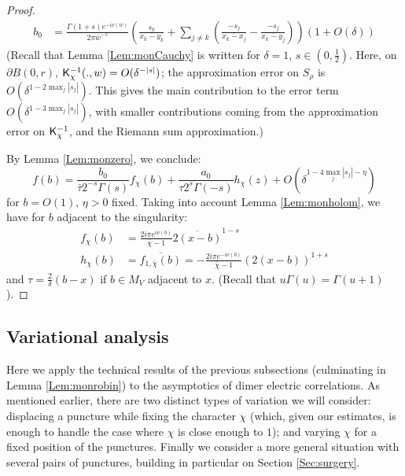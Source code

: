 \documentclass[10pt]{article}
\newcommand{\rK}{{\sf K}}
\begin{document}
\begin{proof}
\begin{align*}
b_0&=\frac{\Gamma(1+s)e^{-i\nu(w)}}{2\pi \bar w^{-s}}\left(\frac{s_k}{\overline{x_k-y_k}}+\sum_{j\neq k}\left(\frac{-s_j}{\overline{x_k-x_j}}-\frac{-s_j}{\overline{x_k-y_j}}\right)\right)(1+O(\delta))
\end{align*}
(Recall that Lemma \ref{Lem:monCauchy} is written for $\delta=1$, $s\in(0,\frac 12)$. Here, on $\partial B(0,r)$, $\rK^{-1}_\chi(.,w)=O(\delta^{-|s|})$; the approximation error on $S_\rho$ is $O(\delta^{1-2\max_j|s_j|})$. This gives the main contribution to the error term $O(\delta^{1-3\max_j|s_j|})$, with smaller contributions coming from the approximation error on $\rK_\chi^{-1}$, and the Riemann sum approximation.)


By Lemma \ref{Lem:monzero}, we conclude:
$$f(b)=\frac{b_0}{\bar\tau 2^{-s}\Gamma(s)}f_\chi(b)+\frac{a_0}{\tau 2^s\Gamma(-s)}h_\chi(z)+O(\delta^{1-4\max_j|s_j|-\eta})$$
for $b=O(1)$, $\eta>0$ fixed. Taking into account Lemma \ref{Lem:monholom}, we have for $b$ adjacent to the singularity:
\begin{align*}
f_\chi(b)&=\frac{2i\pi e^{i\nu(b)}}{\bar \chi-1}\overline{2(x-b)}^{1-s}\\
h_\chi(b)&=\overline{f_{1,\bar\chi}(b)}=-\frac{2i\pi e^{-i\nu(b)}}{\bar \chi-1}{(2(x-b))}^{1+s}
\end{align*}
and $\tau=\frac 2\delta(b-x)$ if $b\in M_V$ adjacent to $x$. (Recall that $u\Gamma(u)=\Gamma(u+1)$).
\end{proof}

%
%

%
%
%
%
%
%
%

%
%
%
%
%
%
%
%
%
%
%
%
%
%
%

%
%
%
%
%
%
%

%

%
%
%
%
%
%
%
%
%
%
%
%
%
%
%
%
%
%
%
%
%
%
%
%
%
%
%
%
%
%
%
%
%
%
%
%
%
%
%
%
%
%
%
%
%
%
%
%
%
%
%
%
%
%
%
%
%
%
%
%
%
%
%
%
%
%
%
%
%
%


\subsection{Variational analysis}\label{ssec:monovariat}

Here we apply the technical results of the previous subsections (culminating in Lemma \ref{Lem:monrobin}) to the asymptotics of dimer electric correlations. As mentioned earlier, there are two distinct types of variation we will consider: displacing a puncture while fixing the character $\chi$ (which, given our estimates, is enough to handle the case where $\chi$ is close enough to $1$); and varying $\chi$ for a fixed position of the punctures. Finally we consider a more general situation with several pairs of punctures, building in particular on Section \ref{Sec:surgery}.
\end{document}
